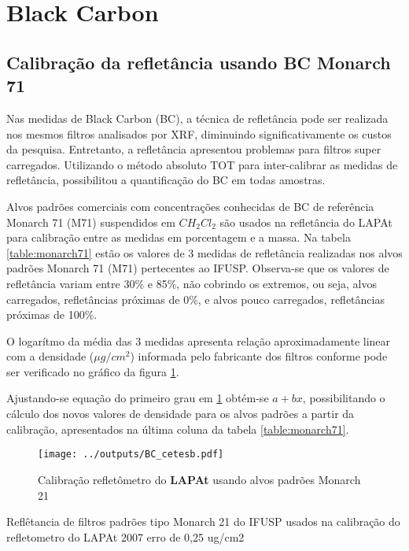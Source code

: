 \section{Black Carbon}

\subsection{Calibração da refletância usando BC Monarch 71}

Nas medidas de Black Carbon (BC), a técnica de refletância pode ser realizada nos mesmos filtros analisados por XRF, diminuindo significativamente os custos da pesquisa. Entretanto, a refletância apresentou problemas para filtros super carregados. Utilizando o método absoluto TOT para inter-calibrar as medidas de refletância, possibilitou a quantificação do BC em todas amostras.

Alvos padrões comerciais com concentrações conhecidas de BC de referência 
Monarch 71 (M71) suspendidos em $CH_2Cl_2$ \citep{clarke1986} são usados na 
refletância do LAPAt para calibração entre as medidas em porcentagem e a massa.
Na tabela \ref{table:monarch71} estão os valores de 3 medidas de refletância  
realizadas nos alvos padrões Monarch 71 (M71) pertecentes ao IFUSP.
Observa-se que os valores de refletância variam entre 30\% e 85\%, não cobrindo
os extremos, ou seja, alvos carregados, refletâncias próximas de 0\%, e alvos
pouco carregados, refletâncias próximas de 100\%.

O logarítmo da média das 3 medidas apresenta relação aproximadamente linear 
com a densidade ($\mu g /cm^2$) informada pelo fabricante dos filtros 
conforme pode ser verificado no gráfico da figura \ref{fig:monarch71}.

Ajustando-se equação do primeiro grau em \ref{fig:monarch71} obtém-se 
$a + bx$, possibilitando o cálculo dos novos valores de densidade para os 
alvos padrões a partir da calibração, apresentados na última coluna da tabela 
\ref{table:monarch71}.

\begin{figure}
  \centering
  \texttt{[image: ../outputs/BC\_cetesb.pdf]}
  \caption{Calibração refletômetro do \textbf{LAPAt} usando alvos padrões Monarch 21
         \label{fig:monarch71}}
\end{figure}

\newpage
\begin{table}
  \centering
  \small
    
    \caption{Reflêtancia de filtros padrões tipo Monarch 21 \citep{clarke1986} 
           do IFUSP usados na calibração do refletometro do 
           LAPAt 2007  erro de 0,25 ug/cm2 \label{table:monarch71}}
\end{table} 

